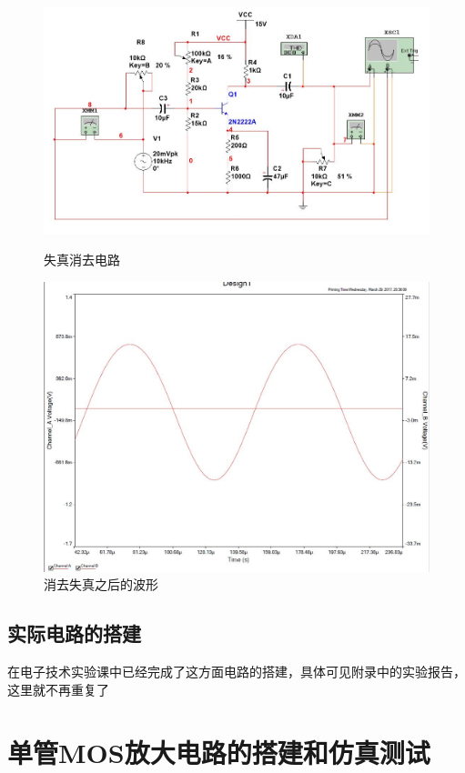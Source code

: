 \documentclass[UTF8,a4paper]{ctexart}
\begin{document}
\begin{figure}
\centering
\includegraphics[width=\textwidth]{1-43mA1k.jpg}
\caption{失真消去电路}
\label{dist2}
\includegraphics[width=\textwidth]{1-41.jpg}
\caption{消去失真之后的波形}
\label{Adist2} 
\end{figure}
\subsection{实际电路的搭建}
在电子技术实验课中已经完成了这方面电路的搭建，具体可见附录中的实验报告，这里就不再重复了
\clearpage
\section{单管MOS放大电路的搭建和仿真测试}
\end{document}
